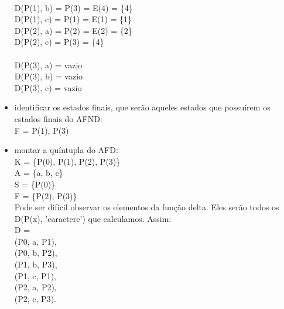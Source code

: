 \documentclass[a4paper,10pt]{article} %
\begin{document}
\begin{itemize}
            \\D(P(1), b) = P(3) = E(4) = \{4\}\\D(P(1), c) = P(1) = E(1) = \{1\}\\D(P(2), a) = P(2) = E(2) = \{2\}\\D(P(2), c) = P(3) = \{4\}\\
            \\D(P(3), a) = vazio\\D(P(3), b) = vazio\\D(P(3), c) = vazio
        \item identificar os estados finais, que serão aqueles estados que possuírem os estados finais do AFND:
            \\F = {P(1), P(3)}
        \item montar a quíntupla do AFD:
            \\K = \{P(0), P(1), P(2), P(3)\}\\A = \{a, b, c\}\\S = \{P(0)\}\\F = \{P(2), P(3)\}\\Pode ser difícil observar os elementos da função delta. Eles serão todos os D(P(x), 'caractere') que calculamos. Assim:\\D =\\(P0, a, P1),\\(P0, b, P2),\\(P1, b, P3),\\(P1, c, P1),\\(P2, a, P2),\\(P2, c, P3).
    \end{itemize}
    \begin{center}
    \end{center}

\newpage
\end{document}

